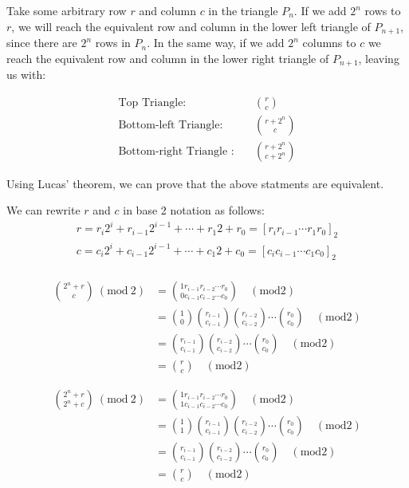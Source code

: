 \documentclass[11pt]{article}
\begin{document}
\begin{enumerate}
Take some arbitrary row \(r\) and column \(c\) in the triangle \(P_{n}\). If we add \(2^{n}\) rows to \(r\), we will reach the equivalent row and column in the lower left triangle of \(P_{n+1}\), since there are \(2^{n}\) rows in \(P_{n}\). In the same way, if we add \(2^{n}\) columns to \(c\) we reach the equivalent row and column in the lower right triangle of \(P_{n+1}\), leaving us with:

\begin{align*}
\text{Top Triangle:} \quad &\binom{r}{c} \label{eq:top} \\
\text{Bottom-left Triangle:}\quad &\binom{r + 2^n}{c} \label{eq:bottom-left} \\
\text{Bottom-right Triangle :}\quad &\binom{r + 2^n}{c + 2^n} \label{eq:bottom-right}
\end{align*}

Using Lucas' theorem, we can prove that the above statments are equivalent.

We can rewrite \(r\) and \(c\) in base 2 notation as follows:
\begin{align*}
r=r_{i}2^{i}+r_{i-1}2^{i-1}+\cdots + r_{1}2+r_{0}= \left[r_{i}r_{i-1}\cdots r_{1}r_{0}\right]_2\\
c=c_{i}2^{i}+c_{i-1}2^{i-1}+\cdots +c_{1}2+c_{0}=\left[c_{i}c_{i-1}\cdots c_{1}c_{0}\right]_2\\
\end{align*}

\begin{align*}
\binom{2^n + r}{c}~(\text{mod}~2) &= \binom{1r_{i-1}r_{i-2} \cdots r_{0}}{0c_{i-1}c_{i-2} \cdots c_{0}} \quad (\text{mod} 2)\\
&= \binom{1}{0}\binom{r_{i-1}}{c_{i-1}}\binom{r_{i-2}}{c_{i-2}} \cdots \binom{r_0}{c_0} \quad (\text{mod} 2)\\
&=\binom{r_{i-1}}{c_{i-1}}\binom{r_{i-2}}{c_{i-2}} \cdots \binom{r_0}{c_0} \quad (\text{mod} 2)\\
&= \binom{r}{c} \quad (\text{mod} 2)
\end{align*}

\begin{align*}
\binom{2^n + r}{2^n + c}~(\text{mod}~2) &= \binom{1r_{i-1}r_{i-2} \cdots r_{0}}{1c_{i-1}c_{i-2} \cdots c_{0}} \quad (\text{mod} 2)\\
&= \binom{1}{1}\binom{r_{i-1}}{c_{i-1}}\binom{r_{i-2}}{c_{i-2}} \cdots \binom{r_0}{c_0} \quad (\text{mod} 2)\\
&=\binom{r_{i-1}}{c_{i-1}}\binom{r_{i-2}}{c_{i-2}} \cdots \binom{r_0}{c_0} \quad (\text{mod} 2)\\
&= \binom{r}{c} \quad (\text{mod} 2)
\end{align*}


\end{enumerate}
\end{document}
